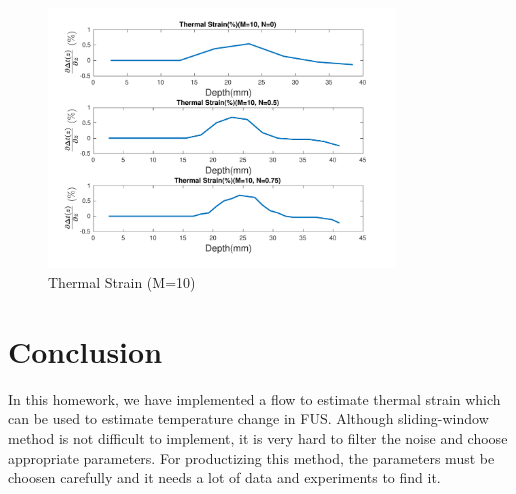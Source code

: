 \documentclass{article}
\begin{document}
\begin{figure}[H]
    \centering
    \includegraphics[width=0.82\textwidth]{src/strain_10.pdf}
    \caption{Thermal Strain (M=10)}
    \label{fig:strain-10}
\end{figure}

\section{Conclusion}
In this homework, we have implemented a flow to estimate thermal strain which can be used to estimate temperature change in FUS.
Although sliding-window method is not difficult to implement, it is very hard to filter the noise and choose appropriate
parameters. For productizing this method, the parameters must be choosen carefully and it needs a lot of data and experiments
to find it.
\end{document}
